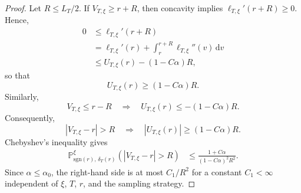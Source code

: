 \documentclass[10pt]{article}
\newcommand{\dd}{\mathrm{d}}
\theoremstyle{plain}
\begin{document}
\begin{proof}
Let $R\le L_T/2$. If $V_{T,\xi}\ge r+R$, then concavity implies
$\ell_{T,\xi}'(r+R)\ge0$. Hence,
\[
\begin{aligned}
    0
    &\le
    \ell_{T,\xi}'(r+R)\\
    &=
    \ell_{T,\xi}'(r)
    +
    \int_r^{r+R}
        \ell_{T,\xi}''(v)
    \,\dd v\\
    &\le
    U_{T,\xi}(r)
    -
    (1-C\alpha)R,
\end{aligned}
\]
so that
\[
    U_{T,\xi}(r)
    \ge
    (1-C\alpha)R.
\]
Similarly,
\[
    V_{T,\xi}\le r-R
    \quad\Longrightarrow\quad
    U_{T,\xi}(r)
    \le
    -(1-C\alpha)R.
\]
Consequently,
\[
    |V_{T,\xi}-r|>R
    \quad\Longrightarrow\quad
    |U_{T,\xi}(r)|
    \ge
    (1-C\alpha)R.
\]
Chebyshev's inequality gives
\[
\begin{aligned}
    \mathbb P_{\mathrm{sgn}(r),\,\delta_T(r)}^\xi
    \left(
        |V_{T,\xi}-r|>R
    \right)
    &\le
    \frac{
        1+C\alpha
    }{
        (1-C\alpha)^2R^2
    }.
\end{aligned}
\]
Since $\alpha\le\alpha_0$, the right-hand side is at most $C_1/R^2$
for a constant $C_1<\infty$ independent of $\xi$, $T$, $r$, and the
sampling strategy. 
\end{proof}
\end{document}
